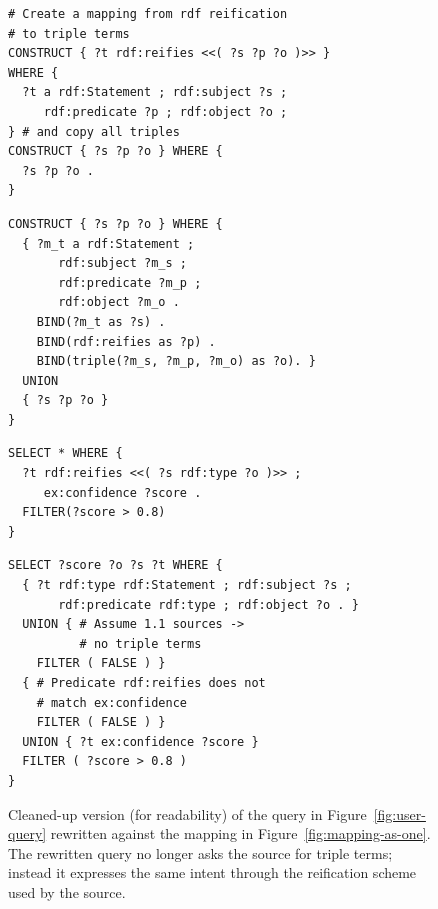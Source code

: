 \documentclass[
]{ceurart}
\begin{document}
\begin{figure}[width=0.485\textwidth]
\begin{minipage}[t]{0.485\textwidth}
\begin{lstlisting}
# Create a mapping from rdf reification
# to triple terms
CONSTRUCT { ?t rdf:reifies <<( ?s ?p ?o )>> }
WHERE {
  ?t a rdf:Statement ; rdf:subject ?s ;
     rdf:predicate ?p ; rdf:object ?o ;
} # and copy all triples
CONSTRUCT { ?s ?p ?o } WHERE {
  ?s ?p ?o .
}
\end{lstlisting}
  \caption{Two mappings: one constructs triple terms in the global,
    the other passes source triples through unchanged.}
  \label{fig:mapping}

\begin{lstlisting}
CONSTRUCT { ?s ?p ?o } WHERE {
  { ?m_t a rdf:Statement ;
       rdf:subject ?m_s ;
       rdf:predicate ?m_p ;
       rdf:object ?m_o .
    BIND(?m_t as ?s) .
    BIND(rdf:reifies as ?p) .
    BIND(triple(?m_s, ?m_p, ?m_o) as ?o). }
  UNION
  { ?s ?p ?o }
}
\end{lstlisting}
  \caption{The same global as Figure~\ref{fig:mapping}, expressed as a
    single CONSTRUCT required for the GAV-unfolding algorithm.}
  \label{fig:mapping-as-one}
\end{minipage}\hfill
\begin{minipage}[t]{0.485\textwidth}
\begin{lstlisting}
SELECT * WHERE {
  ?t rdf:reifies <<( ?s rdf:type ?o )>> ;
     ex:confidence ?score .
  FILTER(?score > 0.8)
}
\end{lstlisting}
  \caption{Example user query: triple terms asserting
    \texttt{rdf:type} with a confidence score above 0.8.}
  \label{fig:user-query}

\begin{lstlisting}
SELECT ?score ?o ?s ?t WHERE {
  { ?t rdf:type rdf:Statement ; rdf:subject ?s ;
       rdf:predicate rdf:type ; rdf:object ?o . }
  UNION { # Assume 1.1 sources ->
          # no triple terms
    FILTER ( FALSE ) }
  { # Predicate rdf:reifies does not
    # match ex:confidence
    FILTER ( FALSE ) }
  UNION { ?t ex:confidence ?score }
  FILTER ( ?score > 0.8 )
}
\end{lstlisting}
  \caption{Cleaned-up version (for readability) of the query in
    Figure~\ref{fig:user-query} rewritten against the mapping in
    Figure~\ref{fig:mapping-as-one}. The rewritten query no longer
    asks the source for triple terms; instead it expresses the same
    intent through the reification scheme used by the source.}
  \label{fig:rewritten-query}
\end{minipage}
\end{figure}
\end{document}
